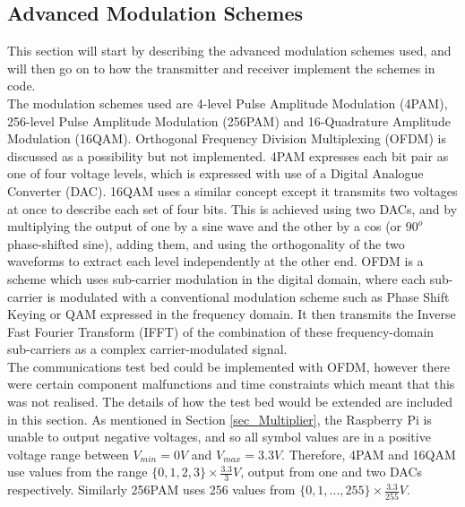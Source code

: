 \documentclass[../main.tex]{subfiles}
\begin{document}
\subsection{Advanced Modulation Schemes} \label{sec_Advanced Modulation Schemes}

This section will start by describing the advanced modulation schemes used, and will then go on to how the transmitter and receiver implement  the schemes in code.\\

The modulation schemes used are 4-level Pulse Amplitude Modulation (4PAM), 256-level Pulse Amplitude Modulation (256PAM) and 16-Quadrature Amplitude Modulation (16QAM).
Orthogonal Frequency Division Multiplexing (OFDM) is discussed as a possibility but not implemented.
4PAM expresses each bit pair as one of four voltage levels, which is expressed with use of a Digital Analogue Converter (DAC).
16QAM uses a similar concept except it transmits two voltages at once to describe each set of four bits.
This is achieved using two DACs, and by multiplying the output of one by a sine wave and the other by a cos (or $90^o$ phase-shifted sine), adding them, and using the orthogonality of the two waveforms to extract each level independently at the other end.
OFDM is a scheme which uses sub-carrier modulation in the digital domain, where each sub-carrier is modulated with a conventional modulation scheme such as Phase Shift Keying or QAM expressed in the frequency domain.
It then transmits the Inverse Fast Fourier Transform (IFFT) of the combination of these frequency-domain sub-carriers as a complex carrier-modulated signal.\\

The communications test bed could be implemented with OFDM, however there were certain component malfunctions and time constraints which meant that this was not realised.
The details of how the test bed would be extended are included in this section.
As mentioned in Section \ref{sec_Multiplier}, the Raspberry Pi is unable to output negative voltages, and so all symbol values are in a positive voltage range between $V_{min} = 0V$ and $V_{max} = 3.3V$.
Therefore, 4PAM and 16QAM use values from the range $\{0, 1, 2, 3\} \times \frac{3.3}{3}V$, output from one and two DACs respectively.
Similarly 256PAM uses 256 values from $\{0, 1, ..., 255\} \times \frac{3.3}{255}V$.\\
\end{document}
